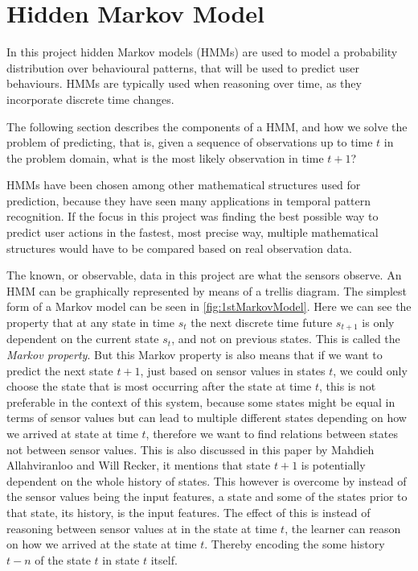 \section{Hidden Markov Model}
\label{sec:hmm}
In this project hidden Markov models (HMMs) are used to model a probability distribution over behavioural patterns, that will be used to predict user behaviours. HMMs are typically used when reasoning over time, as they incorporate discrete time changes. 

The following section describes the components of a HMM, and how we solve the problem of predicting, that is, given a sequence of observations up to time $t$ in the problem domain, what is the most likely observation in time $t+1$?

HMMs have been chosen among other mathematical structures used for prediction, because they have seen many applications in temporal pattern recognition. If the focus in this project was finding the best possible way to predict user actions in the fastest, most precise way, multiple mathematical structures would have to be compared based on real observation data.

The known, or observable, data in this project are what the sensors observe. 
An HMM can be graphically represented by means of a trellis diagram\cite{russell2010artificial}. The simplest form of a Markov model can be seen in \cref{fig:1stMarkovModel}. Here we can see the property that at any state in time $s_t$ the next discrete time future $s_{t+1}$ is only dependent on the current state $s_t$, and not on previous states. This is called the \emph{Markov property}. But this Markov property is also means that if we want to predict the next state $t+1$, just based on sensor values in states $t$, we could only choose the state that is most occurring after the state at time $t$, this is not preferable in the context of this system, because some states might be equal in terms of sensor values but can lead to multiple different states depending on how we arrived at state at time $t$, therefore we want to find relations between states not between sensor values. This is also discussed in this paper\cite{Allahviranloo201316} by Mahdieh Allahviranloo and Will Recker, it mentions that state $t+1$ is potentially dependent on the whole history of states. This however is overcome by instead of the sensor values being the input features, a state and some of the states prior to that state, its history, is the input features. The effect of this is instead of reasoning between sensor values at in the state at time $t$, the learner can reason on how we arrived at the state at time $t$. Thereby encoding the some history $t-n$ of the state $t$ in state $t$ itself.

